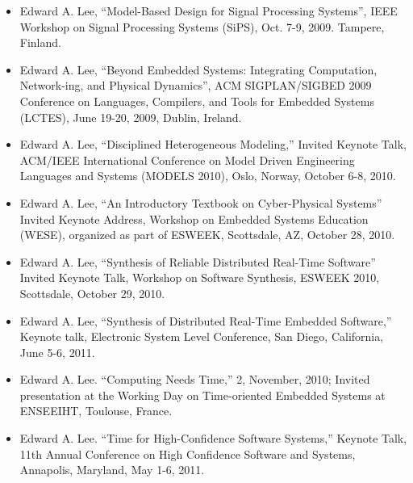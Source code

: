                  \begin{itemize}

                 \item Edward A. Lee, ``Model-Based Design for Signal Processing Systems'', IEEE Workshop on Signal Processing Systems (SiPS), Oct. 7-9, 2009. Tampere, Finland.

                 \item Edward A. Lee, ``Beyond Embedded Systems: Integrating Computation, Network-ing, and Physical Dynamics'', ACM SIGPLAN/SIGBED 2009 Conference on Languages, Compilers, and Tools for Embedded Systems (LCTES), June 19-20, 2009, Dublin, Ireland. 

                 \item Edward A. Lee, ``Disciplined Heterogeneous Modeling,''\cite{Lee10_DisciplinedHeterogeneousModelingProceedings} Invited
                   Keynote Talk, ACM/IEEE International Conference on Model Driven
                   Engineering Languages and Systems (MODELS 2010), Oslo, Norway,
                   October 6-8, 2010.

                 \item Edward A. Lee, ``An Introductory Textbook on Cyber-Physical Systems'' \cite{Lee10_IntroductoryTextbookOnCyberPhysicalSystems} Invited Keynote Address, Workshop on Embedded Systems
                   Education (WESE), organized as part of ESWEEK, Scottsdale, AZ,
                   October 28, 2010.

                 \item Edward A. Lee, ``Synthesis of Reliable Distributed Real-Time Software'' \cite{Lee10_SynthesisOfReliableDistributedRealTimeSoftware} Invited Keynote Talk, Workshop on Software Synthesis,
                   ESWEEK 2010, Scottsdale, October 29, 2010.

                 \item Edward A. Lee, ``Synthesis of Distributed Real-Time Embedded Software,''\cite{Lee11_SynthesisOfDistributedRealTimeEmbeddedSoftware} Keynote talk, Electronic System Level Conference, San
                   Diego, California, June 5-6, 2011.

                 \item Edward A. Lee. ``Computing Needs Time,''\cite{Lee10_ComputingNeedsTime_ENSEEIHT} 2, November, 2010; Invited presentation at
                   the Working Day on Time-oriented Embedded Systems
                   at ENSEEIHT, Toulouse, France.

                 \item Edward A. Lee. ``Time for High-Confidence Software Systems,''\cite{Lee11_TimeForHighConfidenceSoftwareSystems}
                   Keynote Talk, 11th Annual Conference on High Confidence
                   Software and Systems, Annapolis, Maryland, May 1-6, 2011.

                 \end{itemize}

